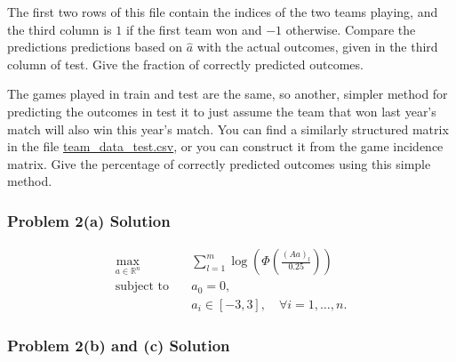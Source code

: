 \documentclass[
  letterpaper,
  DIV=11,
  numbers=noendperiod]{scrartcl}
\begin{document}
The first two rows of this file contain the indices of the two teams
playing, and the third column is \(1\) if the first team won and \(-1\)
otherwise. Compare the predictions predictions based on \(\hat{a}\) with
the actual outcomes, given in the third column of test. Give the
fraction of correctly predicted outcomes.

The games played in train and test are the same, so another, simpler
method for predicting the outcomes in test it to just assume the team
that won last year's match will also win this year's match. You can find
a similarly structured matrix in the file
\href{https://github.com/georgehagstrom/DATA609Spring2025/blob/main/website/assignments/labs/labData/team_data_test.csv}{team\_data\_test.csv},
or you can construct it from the game incidence matrix. Give the
percentage of correctly predicted outcomes using this simple method.

\subsubsection{Problem 2(a) Solution}\label{problem-2a-solution}

\[
\begin{aligned}
\max_{a \in \mathbb{R}^n} \quad & \sum_{l=1}^m \log\left( \Phi\left( \frac{(A a)_l}{0.25} \right) \right) \\
\text{subject to} \quad & a_0 = 0, \\
& a_i \in [-3, 3], \quad \forall i = 1, \dotsc, n.
\end{aligned}
\]

\subsubsection{Problem 2(b) and (c)
Solution}\label{problem-2b-and-c-solution}
\end{document}
